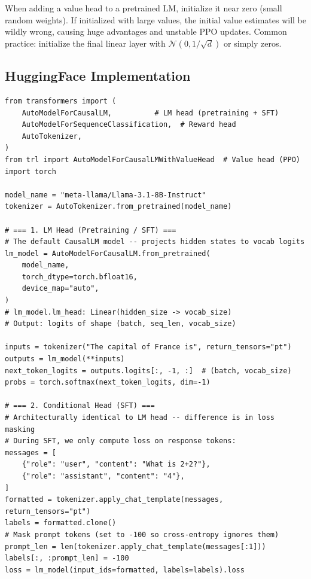 \begin{warningbox}
When adding a value head to a pretrained LM, initialize it near zero (small random weights). If initialized with large values, the initial value estimates will be wildly wrong, causing huge advantages and unstable PPO updates. Common practice: initialize the final linear layer with $\mathcal{N}(0, 1/\sqrt{d})$ or simply zeros.
\end{warningbox}

\subsection{HuggingFace Implementation}
\label{huggingface-implementation}

\begin{lstlisting}[style=pythonstyle, caption={Loading and using different prediction heads with HuggingFace.}]
from transformers import (
    AutoModelForCausalLM,          # LM head (pretraining + SFT)
    AutoModelForSequenceClassification,  # Reward head
    AutoTokenizer,
)
from trl import AutoModelForCausalLMWithValueHead  # Value head (PPO)
import torch

model_name = "meta-llama/Llama-3.1-8B-Instruct"
tokenizer = AutoTokenizer.from_pretrained(model_name)

# === 1. LM Head (Pretraining / SFT) ===
# The default CausalLM model -- projects hidden states to vocab logits
lm_model = AutoModelForCausalLM.from_pretrained(
    model_name,
    torch_dtype=torch.bfloat16,
    device_map="auto",
)
# lm_model.lm_head: Linear(hidden_size -> vocab_size)
# Output: logits of shape (batch, seq_len, vocab_size)

inputs = tokenizer("The capital of France is", return_tensors="pt")
outputs = lm_model(**inputs)
next_token_logits = outputs.logits[:, -1, :]  # (batch, vocab_size)
probs = torch.softmax(next_token_logits, dim=-1)

# === 2. Conditional Head (SFT) ===
# Architecturally identical to LM head -- difference is in loss masking
# During SFT, we only compute loss on response tokens:
messages = [
    {"role": "user", "content": "What is 2+2?"},
    {"role": "assistant", "content": "4"},
]
formatted = tokenizer.apply_chat_template(messages, return_tensors="pt")
labels = formatted.clone()
# Mask prompt tokens (set to -100 so cross-entropy ignores them)
prompt_len = len(tokenizer.apply_chat_template(messages[:1]))
labels[:, :prompt_len] = -100
loss = lm_model(input_ids=formatted, labels=labels).loss


\end{lstlisting}
